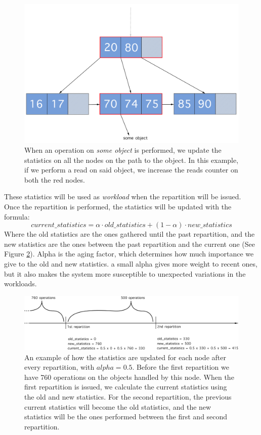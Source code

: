 \begin{figure}[!htb]
  \centering
  \includegraphics[width=\textwidth,height=\textheight,keepaspectratio]{img/b+tree_path.png}
  \caption{ When an operation on \emph{some object} is performed, we update the statistics on all the nodes on the path to the object. In this example, if we perform a read on said object, we increase the reads counter on both the red nodes.}
  \label{fig:b+tree_path}
\end{figure}

These statistics will be used as \emph{workload} when the repartition will be issued. Once the repartition is performed, the statistics will be updated with the formula:
$$ current\_statistics = \alpha \cdot old\_statistics + (1-\alpha) \cdot new\_statistics $$
Where the old statistics are the ones gathered until the past repartition, and the new statistics are the ones between the past repartition and the current one (See Figure \ref{fig:statistics}).
Alpha is the aging factor, which determines how much importance we give to the old and new statistics. a small alpha gives more weight to recent ones, but it also makes the system more susceptible to unexpected variations in the workloads.

\begin{figure}[!htb]
  \centering
  \includegraphics[width=\textwidth,height=\textheight,keepaspectratio]{img/statistics.png}
  \caption{An example of how the statistics are updated for each node after every repartition, with $alpha = 0.5$. Before the first repartition we have 760 operations on the objects handled by this node. When the first repartition is issued, we calculate the current statistics using the old and new statistics. For the second repartition, the previous current statistics will become the old statistics, and the new statistics will be the ones performed between the first and second repartition. }
  \label{fig:statistics}
\end{figure}

